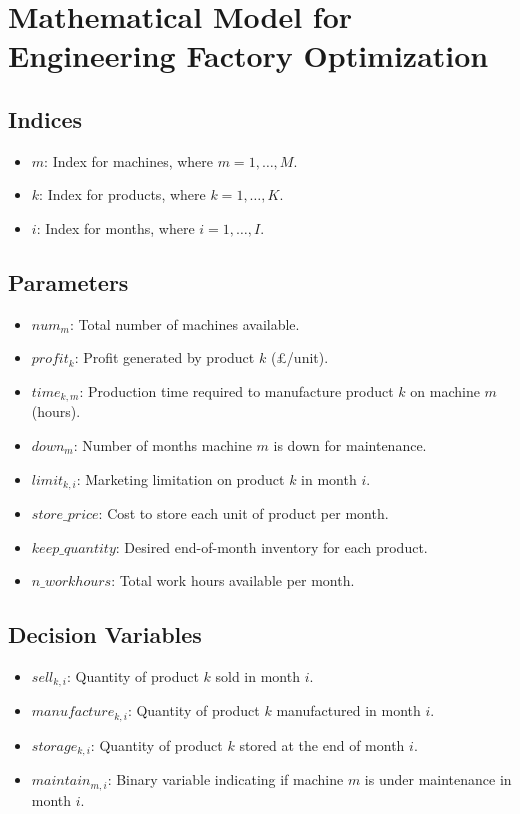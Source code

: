 \documentclass{article}
\begin{document}
\section*{Mathematical Model for Engineering Factory Optimization}

\subsection*{Indices}
\begin{itemize}
    \item $m$: Index for machines, where $m = 1, \ldots, M$.
    \item $k$: Index for products, where $k = 1, \ldots, K$.
    \item $i$: Index for months, where $i = 1, \ldots, I$.
\end{itemize}

\subsection*{Parameters}
\begin{itemize}
    \item $num_m$: Total number of machines available.
    \item $profit_k$: Profit generated by product $k$ (£/unit).
    \item $time_{k,m}$: Production time required to manufacture product $k$ on machine $m$ (hours).
    \item $down_m$: Number of months machine $m$ is down for maintenance.
    \item $limit_{k,i}$: Marketing limitation on product $k$ in month $i$.
    \item $store\_price$: Cost to store each unit of product per month.
    \item $keep\_quantity$: Desired end-of-month inventory for each product.
    \item $n\_workhours$: Total work hours available per month.
\end{itemize}

\subsection*{Decision Variables}
\begin{itemize}
    \item $sell_{k,i}$: Quantity of product $k$ sold in month $i$.
    \item $manufacture_{k,i}$: Quantity of product $k$ manufactured in month $i$.
    \item $storage_{k,i}$: Quantity of product $k$ stored at the end of month $i$.
    \item $maintain_{m,i}$: Binary variable indicating if machine $m$ is under maintenance in month $i$.
\end{itemize}
\end{document}
